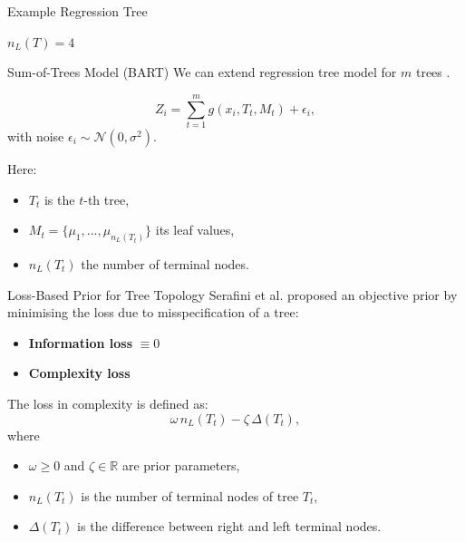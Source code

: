 \documentclass[11pt]{beamer}
\begin{document}
    \begin{frame}{Example Regression Tree}
    \centering
    \vspace{2em}

    \alert{$n_L(T) = 4$}
    \end{frame}
    
    \begin{frame}{Sum-of-Trees Model (BART)}
    We can extend regression tree model for $m$ trees .
    
    
    \[
    Z_i = \sum_{t=1}^m g(x_i, T_t, M_t) + \epsilon_i,
    \]
    with noise $\epsilon_i \sim \mathcal{N}(0, \sigma^2)$.
    
    
    Here:
    \begin{itemize}
    \item $T_t$ is the $t$-th tree,
    \item $M_t = \{\mu_1,\dots,\mu_{n_L(T_t)}\}$ its leaf values,
    \item $n_L(T_t)$ the number of terminal nodes.
    \end{itemize}
    \end{frame}

    \begin{frame}{Loss-Based Prior for Tree Topology}
    Serafini et al. proposed an objective prior by minimising the loss due to misspecification of a tree:
    \begin{itemize}
    \item \textbf{Information loss} $\equiv 0$
    \item \textbf{Complexity loss}
    \end{itemize}
    
    
    The loss in complexity is defined as:
    \[
    \omega\, n_L(T_t) - \zeta\, \Delta(T_t),
    \]
    where
    \begin{itemize}
    \item $\omega \ge 0$ and $\zeta \in \mathbb{R}$ are prior parameters,
    \item $n_L(T_t)$ is the number of terminal nodes of tree $T_t$,
    \item $\Delta(T_t)$ is the difference between right and left terminal nodes.
    \end{itemize}
    \end{frame}
\end{document}
